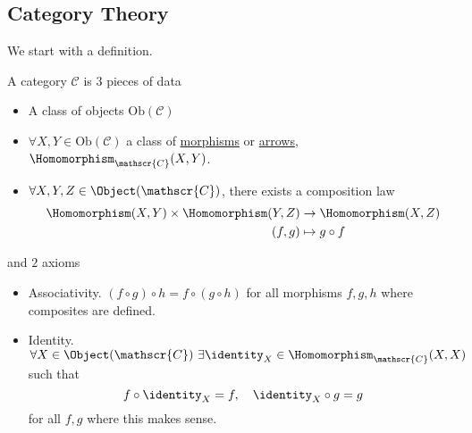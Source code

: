 \subsection{Category Theory}
We start with a definition.
\begin{definition}
	A category \(\mathscr{C} \) is \(3\) pieces of data
	\begin{itemize}
		\item A class of objects \(\mathrm{Ob}(\mathscr{C})\)
		\item \(\forall X, Y\in\mathrm{Ob} (\mathscr{C})\) a class of \underline{morphisms} or \underline{arrows},
		      \(\Homomorphism_{\mathscr{C}}(X, Y)\).
		\item \(\forall X, Y, Z\in \Object (\mathscr{C})\), there exists a composition law
		      \[
			      \begin{split}
				      \Homomorphism (X, Y)\times \Homomorphism (Y, Z)&\to \Homomorphism (X, Z)\\
				      (f, g)&\mapsto g\circ f
			      \end{split}
		      \]
	\end{itemize}
	and \(2\) axioms
	\begin{itemize}
		\item Associativity. \((f\circ g)\circ h = f\circ (g\circ h)\) for all morphisms \(f, g, h\) where composites are defined.
		\item Identity. \(\forall X\in\Object (\mathscr{C})\ \exists \identity_{X}\in\Homomorphism _{\mathscr{C}} (X, X)\) such that
		      \[
			      f\circ \identity_{X} = f,\quad \identity_{X} \circ g = g
		      \]
		      for all \(f, g\) where this makes sense.
	\end{itemize}
\end{definition}

